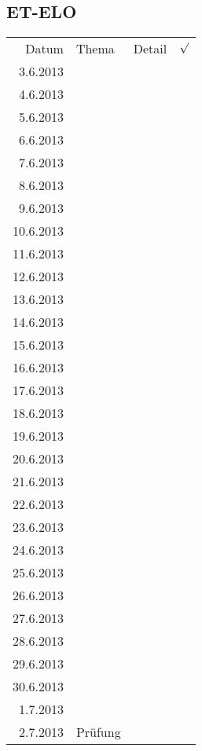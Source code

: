 \subsection{ET-ELO}
\begin{tabular}{r l p{} l}
\rowcolor{lgray} Datum     & Thema         & Detail & $\surd$ \\
\rowcolor{white}  3.6.2013 &               &  &  \\
\rowcolor{lgray}  4.6.2013 &               &  &  \\
\rowcolor{white}  5.6.2013 &               &  &  \\
\rowcolor{lgray}  6.6.2013 &               &  &  \\
\rowcolor{white}  7.6.2013 &               &  &  \\
\rowcolor{lgray}  8.6.2013 &               &  &  \\
\rowcolor{white}  9.6.2013 &               &  &  \\
\rowcolor{lgray} 10.6.2013 &               &  &  \\
\rowcolor{white} 11.6.2013 &               &  &  \\
\rowcolor{lgray} 12.6.2013 &               &  &  \\
\rowcolor{white} 13.6.2013 &               &  &  \\
\rowcolor{lgray} 14.6.2013 &               &  &  \\
\rowcolor{white} 15.6.2013 &               &  &  \\
\rowcolor{lgray} 16.6.2013 &               &  &  \\
\rowcolor{white} 17.6.2013 &               &  &  \\
\rowcolor{lgray} 18.6.2013 &               &  &  \\
\rowcolor{white} 19.6.2013 &               &  &  \\
\rowcolor{lgray} 20.6.2013 &               &  &  \\
\rowcolor{white} 21.6.2013 &               &  &  \\
\rowcolor{lgray} 22.6.2013 &               &  &  \\
\rowcolor{white} 23.6.2013 &               &  &  \\
\rowcolor{lgray} 24.6.2013 &               &  &  \\
\rowcolor{white} 25.6.2013 &               &  &  \\
\rowcolor{lgray} 26.6.2013 &               &  &  \\
\rowcolor{white} 27.6.2013 &               &  &  \\
\rowcolor{lgray} 28.6.2013 &               &  &  \\
\rowcolor{white} 29.6.2013 &               &  &  \\
\rowcolor{lgray} 30.6.2013 &               &  &  \\
\rowcolor{white}  1.7.2013 &               &  &  \\
\rowcolor{lgray}  2.7.2013 & Prüfung       &  &  \\
\end{tabular}

